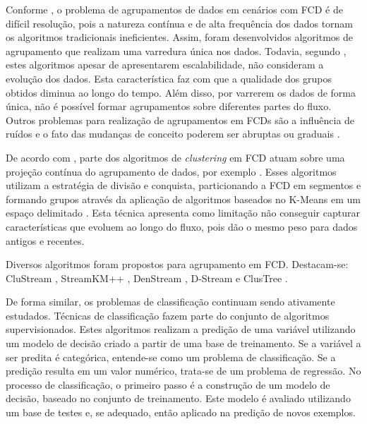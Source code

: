 \documentclass[qual, classic, a4paper]{ufbathesis}
\begin{document}
Conforme \cite{Aggarwal:2003:FCE:1315451.1315460}, o problema de agrupamentos de dados em cenários com FCD é de difícil resolução,
pois a natureza contínua e de alta frequência dos dados tornam os algoritmos tradicionais ineficientes.
Assim, foram desenvolvidos algoritmos de agrupamento que realizam uma varredura única nos dados. 
Todavia, segundo \cite{Aggarwal:2003:FCE:1315451.1315460}, estes algoritmos apesar de apresentarem escalabilidade, 
não consideram a evolução dos dados. 
Esta característica faz com que a qualidade dos grupos obtidos diminua ao longo do tempo.
Além disso, por varrerem os dados de forma única, não é possível formar agrupamentos sobre diferentes partes do fluxo.
Outros problemas para realização de agrupamentos em FCDs são a influência de ruídos e o fato das mudanças de conceito poderem ser abruptas ou graduais \cite{Khalilian:DBLP:journals/corr/abs-1006-5261}.

De acordo com \cite{Chen:Tu}, 
parte dos algoritmos de \textit{clustering} em FCD atuam sobre uma projeção contínua do agrupamento de dados, por exemplo \cite{Guha:2003:CDS:776752.776777}.
Esses algoritmos utilizam a estratégia de divisão e conquista, particionando a FCD em segmentos e 
formando grupos através da aplicação de algoritmos baseados no K-Means em um espaço delimitado \cite{Guha:2000:CDS:795666.796588}.
Esta técnica apresenta como limitação não conseguir capturar características que evoluem ao longo do fluxo, 
pois dão o mesmo peso para dados antigos e recentes.
 
Diversos algoritmos foram propostos para agrupamento em FCD. 
Destacam-se: 
CluStream \cite{Aggarwal:2003:FCE:1315451.1315460},
StreamKM++ \cite{Ackermann:2012:SCA:2133803.2184450},
DenStream \cite{Cao:Feng:Ester},
D-Stream \cite{Chen:Tu} e ClusTree \cite{Kranen:2011:CIM:2134350.2134352}.

De forma similar, os problemas de classificação continuam sendo ativamente estudados.
Técnicas de classificação fazem parte do conjunto de algoritmos supervisionados.
Estes algoritmos realizam a predição de uma variável utilizando um modelo de decisão criado a partir de uma base de treinamento.
Se a variável a ser predita é categórica, entende-se como um problema de classificação.
Se a predição resulta em um valor numérico, trata-se de um problema de regressão.
No processo de classificação, o primeiro passo é a construção de um modelo de decisão, baseado no conjunto de treinamento.
Este modelo é avaliado utilizando um base de testes e, se adequado, então aplicado na predição de novos exemplos.
\end{document}
